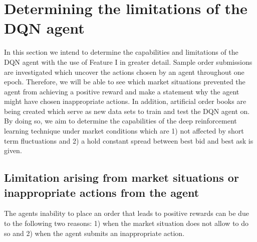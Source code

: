 \section{Determining the limitations of the DQN agent}
\label{sec:eval-dqn-limitations}
In this section we intend to determine the capabilities and limitations of the DQN agent with the use of Feature I in greater detail.
Sample order submissions are investigated which uncover the actions chosen by an agent throughout one epoch.
Therefore, we will be able to see which market situations prevented the agent from achieving a positive reward and make a statement why the agent might have chosen inappropriate actions.
In addition, artificial order books are being created which serve as new data sets to train and test the DQN agent on.
By doing so, we aim to determine the capabilities of the deep reinforcement learning technique under market conditions which are 1) not affected by short term fluctuations and 2) a hold constant spread between best bid and best ask is given.

\subsection{Limitation arising from market situations or inappropriate actions from the agent}
The agents inability to place an order that leads to positive rewards can be due to the following two reasons: 1) when the market situation does not allow to do so and 2) when the agent submits an inappropriate action.


